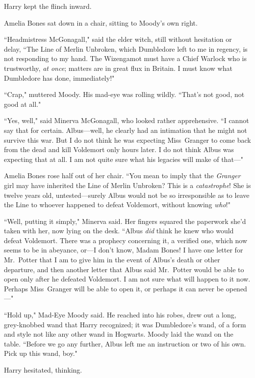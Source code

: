 Harry kept the flinch inward.

Amelia Bones sat down in a chair, sitting to Moody's own right.

``Headmistress McGonagall," said the elder witch, still without hesitation or delay, ``The Line of Merlin Unbroken, which Dumbledore left to me in regency, is not responding to my hand. The Wizengamot must have a Chief Warlock who is trustworthy, \emph{at once}; matters are in great flux in Britain. I must know what Dumbledore has done, immediately!"

``Crap," muttered Moody. His mad-eye was rolling wildly. ``That's not good, not good at all."

``Yes, well," said Minerva McGonagall, who looked rather apprehensive. ``I cannot say that for certain. Albus---well, he clearly had an intimation that he might not survive this war. But I do not think he was expecting Miss~Granger to come back from the dead and kill Voldemort only hours later. I do not think Albus was expecting that at all. I am not quite sure what his legacies will make of that---"

Amelia Bones rose half out of her chair. ``You mean to imply that the \emph{Granger} girl may have inherited the Line of Merlin Unbroken? This is a \emph{catastrophe}! She is twelve years old, untested---surely Albus would not be so irresponsible as to leave the Line to whoever happened to defeat Voldemort, without knowing \emph{who}!"

``Well, putting it simply," Minerva said. Her fingers squared the paperwork she'd taken with her, now lying on the desk. ``Albus \emph{did} think he knew who would defeat Voldemort. There was a prophecy concerning it, a verified one, which now seems to be in abeyance, or---I don't know, Madam Bones! I have one letter for Mr.~Potter that I am to give him in the event of Albus's death or other departure, and then another letter that Albus said Mr.~Potter would be able to open only after he defeated Voldemort. I am not sure what will happen to it now. Perhaps Miss~Granger will be able to open it, or perhaps it can never be opened---"

``Hold up," Mad-Eye Moody said. He reached into his robes, drew out a long, grey-knobbed wand that Harry recognized; it was Dumbledore's wand, of a form and style not like any other wand in Hogwarts. Moody laid the wand on the table. ``Before we go any further, Albus left me an instruction or two of his own. Pick up this wand, boy."

Harry hesitated, thinking.

